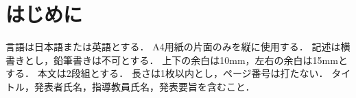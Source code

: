 \documentclass[main]{subfiles}
\begin{document}
\section{はじめに }

言語は日本語または英語とする．
A4用紙の片面のみを縦に使用する．
記述は横書きとし，鉛筆書きは不可とする．
上下の余白は10mm，左右の余白は15mmとする．
本文は2段組とする．
長さは1枚以内とし，ページ番号は打たない．
タイトル，発表者氏名，指導教員氏名，発表要旨を含むこと．
\end{document}
